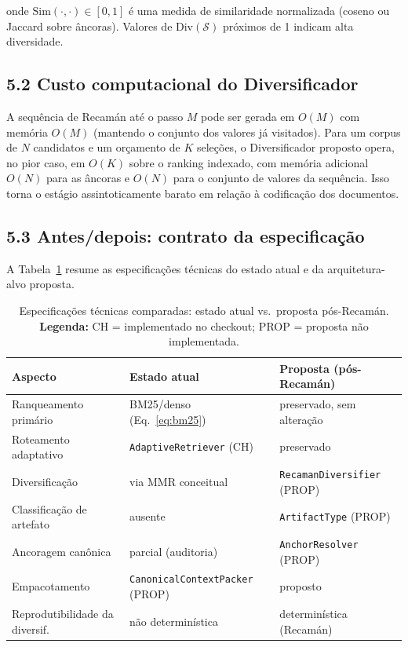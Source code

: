 \documentclass[
	article,
	11pt,
	oneside,
	a4paper,
	english,
	brazil,
	sumario=tradicional
	]{abntex2}
\begin{document}
onde $\text{Sim}(\cdot,\cdot) \in [0,1]$ é uma medida de similaridade normalizada
(coseno ou Jaccard sobre âncoras). Valores de $\text{Div}(\mathcal{S})$ próximos
de 1 indicam alta diversidade.

\subsection*{5.2 Custo computacional do Diversificador}

A sequência de Recamán até o passo $M$ pode ser gerada em $O(M)$ com memória
$O(M)$ (mantendo o conjunto dos valores já visitados). Para um corpus de $N$
candidatos e um orçamento de $K$ seleções, o Diversificador proposto opera, no
pior caso, em $O(K)$ sobre o ranking indexado, com memória adicional $O(N)$ para
as âncoras e $O(N)$ para o conjunto de valores da sequência. Isso torna o estágio
assintoticamente barato em relação à codificação dos documentos.

\subsection*{5.3 Antes/depois: contrato da especificação}

A Tabela~\ref{tab:spec} resume as especificações técnicas do estado atual e da
arquitetura-alvo proposta.

\begin{table}[!htb]
\centering
\caption{Especificações técnicas comparadas: estado atual vs.\ proposta
pós-Recamán. \textbf{Legenda:} CH = implementado no checkout; PROP = proposta não
implementada.}
\label{tab:spec}
\begin{tabularx}{\textwidth}{lXX}
\toprule
\textbf{Aspecto} & \textbf{Estado atual} & \textbf{Proposta (pós-Recamán)} \\
\midrule
Ranqueamento primário & BM25/denso (Eq.~\ref{eq:bm25}) & preservado, sem alteração \\
Roteamento adaptativo & \texttt{AdaptiveRetriever} (CH) & preservado \\
Diversificação & via MMR conceitual & \texttt{RecamanDiversifier} (PROP) \\
Classificação de artefato & ausente & \texttt{ArtifactType} (PROP) \\
Ancoragem canônica & parcial (auditoria) & \texttt{AnchorResolver} (PROP) \\
Empacotamento & \texttt{CanonicalContextPacker} (PROP) & proposto \\
Reprodutibilidade da diversif. & não determinística & determinística (Recamán) \\
\bottomrule
\end{tabularx}
\end{table}
\end{document}
